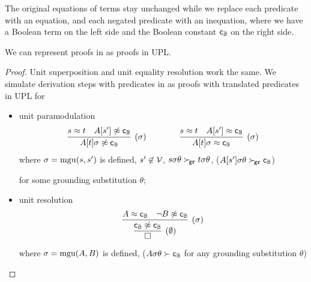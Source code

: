     The original equations of terms stay unchanged
    while we replace each predicate with an equation,
    and each negated predicate with an inequation,
    where we have a Boolean term on the left side
    and the Boolean constant \( {\mathsf{c}}_{\mathbb{B}} \) on the right side.



    \begin{corollary}
        We can represent proofs in \InstGenEQ{}
        as proofs in {UPL}.
    \end{corollary}

    \begin{proof}
        Unit superposition and unit equality resolution work the same.
        We simulate derivation steps with predicates in \InstGenEQ{}
        as proofs with translated predicates in {UPL} for
        \begin{itemize}
            \item unit paramodulation
            \begin{gather*}
                \infer
                [ (\sigma) ]
                {{A}[t]\sigma\mNE\bool{\mc}}
                {s\mEQ t&{A}[s']\mNE\bool{\mc}}
                \qquad\qquad
                \infer
                [ (\sigma)  ]
                {{A}[t]\sigma\mEQ \bool{\mc}}
                {s\mEQ t&{A}[s']\mEQ \bool{\mc}}
                \end{gather*}
            where \( \sigma=\operatorname{mgu}(s,s') \) is defined,
            \( s'\not\in\mathcal{V} \),
            \( s\sigma\theta\mathrel\succ_{\!\mathtt{gr}} t\sigma\theta \),
            {(\( {A}[s']\sigma\theta\mathrel\succ_{\!\mathtt{gr}}{\mathsf{c}}_{\mathbb{B}} \))}

            for some grounding substitution \( \theta \);

            \item %
            unit resolution
            \begin{gather*}
                \infer[(\sigma)]
                {
                    \infer[(\emptyset)]
                    {\emptyclause}
                    {\bool{\mc} \mNE \bool{\mc}}
                    }
                {A\mEQ\bool{\mc} & \lnot B\mNE\bool{\mc}}
            \end{gather*}
            where \( \sigma=\operatorname{mgu}(A,B) \) is defined,
            {
                (\( A\sigma\theta\succ{\mathsf{c}}_{\mathbb{B}} \)
                for any grounding substitution \( \theta \))
            }
        \end{itemize}
    \end{proof}

